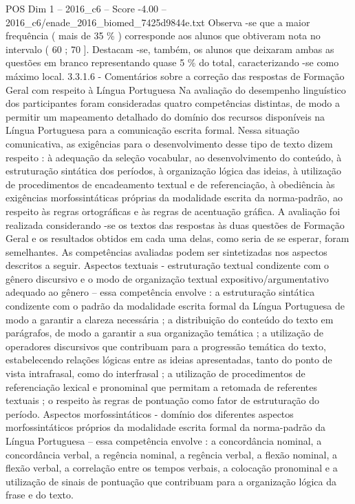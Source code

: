 \begin{textsample}{POS Dim 1 – 2016\_c6 – Score -4.00 – 2016\_c6/enade\_2016\_biomed\_7425d9844e.txt}
Observa -se que a maior frequência ( mais de 35 \% ) corresponde aos alunos que obtiveram nota no intervalo ( 60 ; 70 ].
Destacam -se, também, os alunos que deixaram ambas as questões em branco representando quase 5 \% do total, caracterizando -se como máximo local. 3.3.1.6 - Comentários sobre a correção das respostas de Formação Geral com respeito à Língua Portuguesa Na avaliação do desempenho linguístico dos participantes foram consideradas quatro competências distintas, de modo a permitir um mapeamento detalhado do domínio dos recursos disponíveis na Língua Portuguesa para a comunicação escrita formal.
Nessa situação comunicativa, as exigências para o desenvolvimento desse tipo de texto dizem respeito : à adequação da seleção vocabular, ao desenvolvimento do conteúdo, à estruturação sintática dos períodos, à organização lógica das ideias, à utilização de procedimentos de encadeamento textual e de referenciação, à obediência às exigências morfossintáticas próprias da modalidade escrita da norma-padrão, ao respeito às regras ortográficas e às regras de acentuação gráfica.
A avaliação foi realizada considerando -se os textos das respostas às duas questões de Formação Geral e os resultados obtidos em cada uma delas, como seria de se esperar, foram semelhantes.
As competências avaliadas podem ser sintetizadas nos aspectos descritos a seguir.
Aspectos textuais - estruturação textual condizente com o gênero discursivo e o modo de organização textual expositivo/argumentativo adequado ao gênero – essa competência envolve : a estruturação sintática condizente com o padrão da modalidade escrita formal da Língua Portuguesa de modo a garantir a clareza necessária ; a distribuição do conteúdo do texto em parágrafos, de modo a garantir a sua organização temática ; a utilização de operadores discursivos que contribuam para a progressão temática do texto, estabelecendo relações lógicas entre as ideias apresentadas, tanto do ponto de vista intrafrasal, como do interfrasal ; a utilização de procedimentos de referenciação lexical e pronominal que permitam a retomada de referentes textuais ; o respeito às regras de pontuação como fator de estruturação do período.
Aspectos morfossintáticos - domínio dos diferentes aspectos morfossintáticos próprios da modalidade escrita formal da norma-padrão da Língua Portuguesa – essa competência envolve : a concordância nominal, a concordância verbal, a regência nominal, a regência verbal, a flexão nominal, a flexão verbal, a correlação entre os tempos verbais, a colocação pronominal e a utilização de sinais de pontuação que contribuam para a organização lógica da frase e do texto.

\end{textsample}

